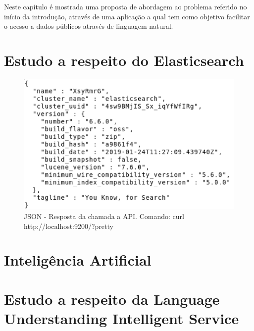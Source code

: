Neste capítulo é mostrada uma proposta de abordagem ao problema referido no início da introdução, através de uma aplicação a qual tem como objetivo facilitar o acesso a dados públicos através de linguagem natural.

\section{Estudo a respeito do Elasticsearch}


\begin{figure}[!htb]
	\caption{\label{pretty}JSON - Resposta da chamada a API. Comando: curl http://localhost:9200/?pretty}
	\begin{center}
		\includegraphics[width=\textwidth]{imagens/pretty.eps}
	\end{center}
\end{figure}

\section{Inteligência Artificial}


\section{Estudo a respeito da Language Understanding Intelligent Service}

